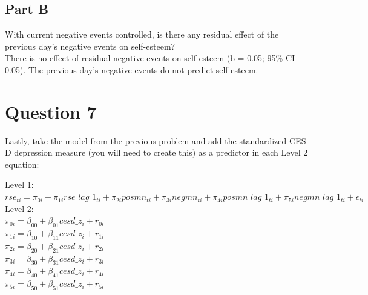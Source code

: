 \documentclass[]{article}
\begin{document}
\subsection{Part B}\label{part-b-4}

With current negative events controlled, is there any residual effect of
the previous day's negative events on self-esteem?\\
There is no effect of residual negative events on self-esteem (b = 0.05;
95\% CI 0.05). The previous day's negative events do not predict self
esteem.

\section{Question 7}\label{question-7}

Lastly, take the model from the previous problem and add the
standardized CES-D depression measure (you will need to create this) as
a predictor in each Level 2 equation:

Level 1:\\
\(rse_{ti} = \pi_{0i} + \pi_{1i}rse\_lag\_1_{ti} + \pi_{2i}posmn_{ti} + \pi_{3i}negmn_{ti} + \pi_{4i}posmn\_lag\_1_{ti} + \pi_{5i}negmn\_lag\_1_{ti} + \epsilon_{ti}\)\\
Level 2:\\
\(\pi_{0i} = \beta_{00} + \beta_{01}cesd\_z_i + r_{0i}\)\\
\(\pi_{1i} = \beta_{10} + \beta_{11}cesd\_z_i + r_{1i}\)\\
\(\pi_{2i} = \beta_{20} + \beta_{21}cesd\_z_i + r_{2i}\)\\
\(\pi_{3i} = \beta_{30} + \beta_{31}cesd\_z_i + r_{3i}\)\\
\(\pi_{4i} = \beta_{40} + \beta_{41}cesd\_z_i + r_{4i}\)\\
\(\pi_{5i} = \beta_{50} + \beta_{51}cesd\_z_i + r_{5i}\)
\end{document}
